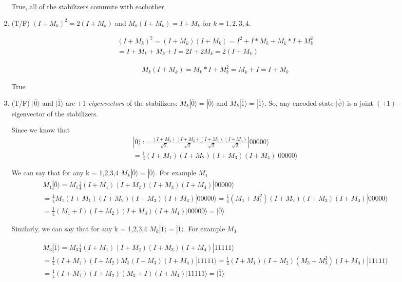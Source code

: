 \documentclass{article}
\renewcommand{\ket}[1]{| #1 \rangle}
\begin{document}
\begin{enumerate}
  True, all of the stabilizers commute with eachother.

\item (T/F) $(I+M_k)^2 = 2(I+M_k)$ and $M_k(I+M_k) = I+M_k$ for $k=1,2,3,4$.

  \begin{gather*}
    (I + M_k)^2 = (I + M_k)(I + M_k) = I^2 + I*M_k + M_k*I + M_k^2\\
    = I + M_k + M_k + I = 2I + 2M_k = 2(I+M_k)
  \end{gather*}

  \begin{gather*}
    M_k(I+M_k) = M_k * I + M_k^2 = M_k + I = I + M_k
  \end{gather*}

  True

\item (T/F) $\ket{\overline{0}}$ and $\ket{\overline{1}}$ are {\em $+1$-eigenvectors} of the stabilizers:
	$M_k\ket{\overline{0}} = \ket{\overline{0}}$ and $M_k\ket{\overline{1}} = \ket{\overline{1}}$.
	So, any encoded state $\ket{\overline{\psi}}$ is a joint $(+1)$-eigenvector of the stabilizers.

  Since we know that 
  \begin{gather*}
    \ket{\overline{0}} := \frac{(I + M_1)}{\sqrt{2}} \frac{(I+M_2)}{\sqrt{2}} \frac{(I+M_3)}{\sqrt{2}} \frac{(I+M_4)}{\sqrt{2}} \ket{00000}\\
    = \frac{1}{4}(I + M_1)(I + M_2)(I + M_3)(I + M_4)\ket{00000}
  \end{gather*}

  We can say that for any k = 1,2,3,4 $M_k\ket{\overline{0}} = \ket{\overline{0}}$. For example $M_1$
  \begin{gather*}
    M_1\ket{\overline{0}} = M_1 \frac{1}{4}(I + M_1)(I + M_2)(I + M_3)(I + M_4)\ket{00000}\\
    = \frac{1}{4}M_1(I + M_1)(I + M_2)(I + M_3)(I + M_4)\ket{00000}
    = \frac{1}{4}(M_1 + M_1^2)(I + M_2)(I + M_3)(I + M_4)\ket{00000}\\
    = \frac{1}{4}(M_1 + I)(I + M_2)(I + M_3)(I + M_4)\ket{00000} = \ket{\overline{0}}
  \end{gather*}

  Similarly, we can say that for any k = 1,2,3,4 $M_k\ket{\overline{1}} = \ket{\overline{1}}$. For example $M_3$

  \begin{gather*}
    M_3\ket{\overline{1}} = M_3 \frac{1}{4}(I + M_1)(I + M_2)(I + M_3)(I + M_4)\ket{11111}\\
    = \frac{1}{4}(I + M_1)(I + M_2)M_3(I + M_3)(I + M_4)\ket{11111}
    = \frac{1}{4}(I + M_1)(I + M_2)(M_3 + M_3^2)(I + M_4)\ket{11111}\\
    = \frac{1}{4}(I + M_1)(I + M_2)(M_3 + I)(I + M_4)\ket{11111} = \ket{\overline{1}}
  \end{gather*}


\end{enumerate}
\end{document}
